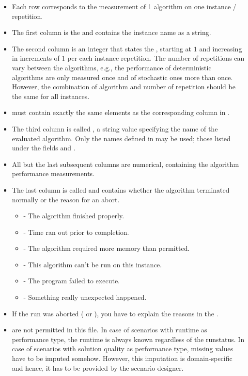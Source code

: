 \begin{itemize}
  	\item Each row corresponds to the measurement of 1 algorithm on one instance / repetition.
  	\item The first column is the  and contains the instance name as a string. 
  	\item The second column is an integer that states the , starting at $1$ and increasing 
		in increments of $1$ per each instance repetition. The number of repetitions can vary between the algorithms,
		e.g., the performance of deterministic algorithms are only measured once and of stochastic ones more than once.
		However, the combination of algorithm and number of repetition should be the same for all instances.
   	\item {} must contain exactly the same elements as the corresponding column in
 		.
  	\item The third column is called , a string value specifying the name of the 
		evaluated algorithm. Only the names defined in  may be used; those listed
		under the fields  and . 
  	\item All but the last subsequent columns are numerical, containing the algorithm performance 
		measurements.
  	\item The last column is called  and contains whether the algorithm terminated 
		normally or the reason for an abort. 
		\begin{itemize}
      			\item {}  - The algorithm finished properly.
      			\item {} - Time ran out prior to completion.
      			\item {} - The algorithm required more memory than permitted.
      			\item {} - This algorithm can't be run on this instance. 
			\item {} - The program failed to execute.
      			\item {} - Something really unexpected happened.
  		\end{itemize}
  	\item If the run was aborted ( or ), you have to explain the reasons 
		in the .
  	\item \qm are not permitted in this file. In case of scenarios with runtime as performance type, the runtime is always known regardless of the runstatus. In case of scenarios with solution quality as performance type, missing values have to be imputed somehow. However, this imputation is domain-specific and hence, it has to be provided by the scenario designer.
\end{itemize}


